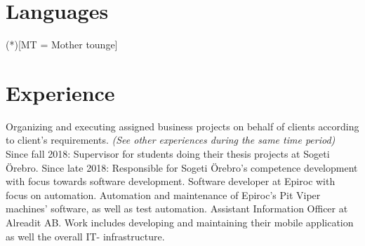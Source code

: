 \documentclass[letterpaper]{twentysecondcv} %
\begin{document}
\begin{twenty} %
\end{twenty}


\section{Languages}

\begin{twentyshort} %
\end{twentyshort}

\footnotesize (*)[MT = Mother tounge]


\section{Experience}

\begin{twenty} %
	{
		Organizing and executing assigned business projects on behalf of clients 			according to client's requirements. \emph{(See other experiences during 			the same time period)}\newline
		Since fall 2018: Supervisor for students doing their thesis projects at 			Sogeti Örebro. \newline
		Since late 2018: Responsible for Sogeti Örebro's competence development 			with focus towards software development.
	}
	{
		Software developer at Epiroc with focus on automation.\newline
		Automation and maintenance of Epiroc's Pit Viper machines' software, 				as well as test automation.
	}
	{
		Assistant Information Officer at Alreadit AB. Work includes developing 				and maintaining their mobile application as well the overall IT-					infrastructure.
	}
\end{twenty}
\end{document}
